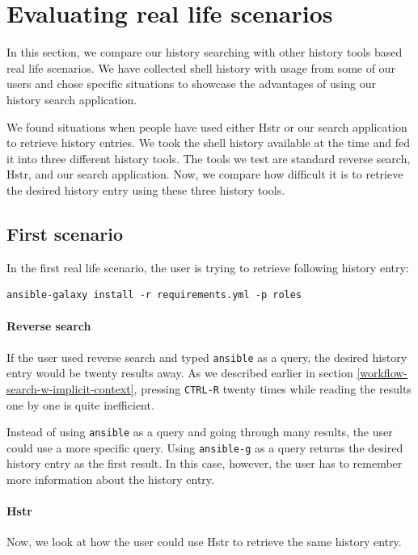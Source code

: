 \section{Evaluating real life scenarios}

In this section, we compare our history searching with other history tools based real life scenarios. We have collected shell history with usage from some of our users and chose specific situations to showcase the advantages of using our history search application.

We found situations when people have used either Hstr\cite{toolshstr} or our search application to retrieve history entries. We took the shell history available at the time and fed it into three different history tools. The tools we test are standard reverse search, Hstr, and our search application. Now, we compare how difficult it is to retrieve the desired history entry using these three history tools.


\subsection{First scenario}

In the first real life scenario, the user is trying to retrieve following history entry: 

\begin{verbatim}
ansible-galaxy install -r requirements.yml -p roles
\end{verbatim}


\paragraph{Reverse search}
If the user used reverse search and typed \verb|ansible| as a query, the desired history entry would be twenty results away. As we described earlier in section  \ref{workflow-search-w-implicit-context}, pressing \verb|CTRL-R| twenty times while reading the results one by one is quite inefficient.

Instead of using \verb|ansible| as a query and going through many results, the user could use a more specific query. Using \verb|ansible-g| as a query returns the desired history entry as the first result. In this case, however, the user has to remember more information about the history entry.

\paragraph{Hstr}
Now, we look at how the user could use Hstr to retrieve the same history entry.

